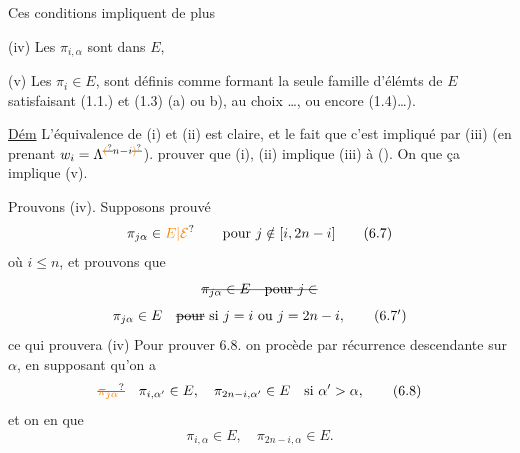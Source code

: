  Ces conditions impliquent de plus

(iv) Les $\pi_{i,\alpha}$ sont dans $E$, 

(v) Les $\pi_i\in E$,  sont définis  comme formant  la seule famille d'élémts de $E$ satisfaisant (1.1.) et (1.3) (a) ou b), au choix \ldots,  ou encore (1.4)\ldots).


\uline{Dém} L'équivalence de (i) et (ii) est claire, et le fait que c'est impliqué par (iii) (en prenant $w_i=\Lambda^{\deleted{\unsure{(}}n-i\deleted{\unsure{)}}}$).   prouver que (i), (ii) implique (iii) à (). On   que ça implique  (v).

Prouvons (iv). Supposons prouvé
\[
 \pi_{j\alpha}\in \unsure{E|\mathcal E}\qquad\text{pour }j\notin[i,2n-i]
 \tag*{(6.7)}
\]
où $i\le n$, et prouvons que
\[
 \deleted{\pi_{j\alpha}\in E\quad\text{pour } j\in}
\]
\[
 \pi_{j\alpha}\in E\quad\deleted{\text{pour}}\ \text{si }j=i\ \text{ou }j=2n-i,
 \tag*{$(6.7')$}
\]
ce qui prouvera (iv)  Pour prouver 6.8. on procède par récurrence  descendante sur $\alpha$, en supposant qu'on a
\[
 \deleted{\unsure{\pi_{j\alpha}}}\quad \pi_{i,\alpha'}\in E,\quad\pi_{2n-i,\alpha'}\in E\quad\text{si }\alpha'>\alpha,
 \tag*{(6.8)}
\]
et on en  que
\[
 \pi_{i,\alpha}\in E,\quad\pi_{2n-i,\alpha}\in E .
 \tag*{$(6.8')$}
\]

